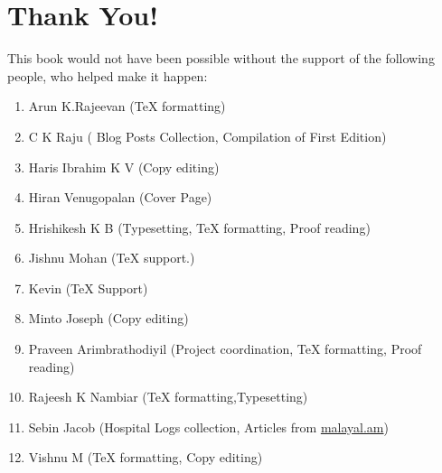 \section*{Thank You!}
{\engtext
This book would not have been possible without the support of the following 
people, who helped make it happen:
\begin{enumerate}
 \item Arun K.Rajeevan ({\TeX} formatting)
 \item C K Raju ( Blog Posts Collection, Compilation of First Edition)
 \item Haris Ibrahim K V (Copy editing)
 \item Hiran Venugopalan (Cover Page)
 \item Hrishikesh K B (Typesetting, {\TeX} formatting, Proof reading)
 \item Jishnu Mohan ({\TeX} support.)
 \item Kevin ({\TeX} Support)
 \item Minto Joseph (Copy editing)
 \item Praveen Arimbrathodiyil (Project coordination, {\TeX} formatting, Proof reading)
 \item Rajeesh K Nambiar ({\TeX} formatting,Typesetting)
 \item Sebin Jacob (Hospital Logs collection, Articles from \url{malayal.am})
 \item Vishnu M ({\TeX} formatting, Copy editing)
 
\end{enumerate}
}
\newpage
